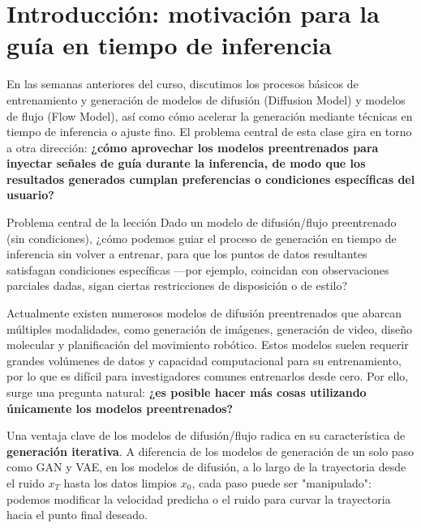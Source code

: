 \section{Introducción: motivación para la guía en tiempo de inferencia}

En las semanas anteriores del curso, discutimos los procesos básicos de entrenamiento y generación de modelos de difusión (Diffusion Model) y modelos de flujo (Flow Model), así como cómo acelerar la generación mediante técnicas en tiempo de inferencia o ajuste fino. El problema central de esta clase gira en torno a otra dirección: \textbf{¿cómo aprovechar los modelos preentrenados para inyectar señales de guía durante la inferencia, de modo que los resultados generados cumplan preferencias o condiciones específicas del usuario?}

\begin{importantbox}{Problema central de la lección}
Dado un modelo de difusión/flujo preentrenado (sin condiciones), ¿cómo podemos guiar el proceso de generación en tiempo de inferencia sin volver a entrenar, para que los puntos de datos resultantes satisfagan condiciones específicas —por ejemplo, coincidan con observaciones parciales dadas, sigan ciertas restricciones de disposición o de estilo?
\end{importantbox}

Actualmente existen numerosos modelos de difusión preentrenados que abarcan múltiples modalidades, como generación de imágenes, generación de video, diseño molecular y planificación del movimiento robótico. Estos modelos suelen requerir grandes volúmenes de datos y capacidad computacional para su entrenamiento, por lo que es difícil para investigadores comunes entrenarlos desde cero. Por ello, surge una pregunta natural: \textbf{¿es posible hacer más cosas utilizando únicamente los modelos preentrenados?}

Una ventaja clave de los modelos de difusión/flujo radica en su característica de \textbf{generación iterativa}. A diferencia de los modelos de generación de un solo paso como GAN y VAE, en los modelos de difusión, a lo largo de la trayectoria desde el ruido $x_T$ hasta los datos limpios $x_0$, cada paso puede ser "manipulado": podemos modificar la velocidad predicha o el ruido para curvar la trayectoria hacia el punto final deseado.

